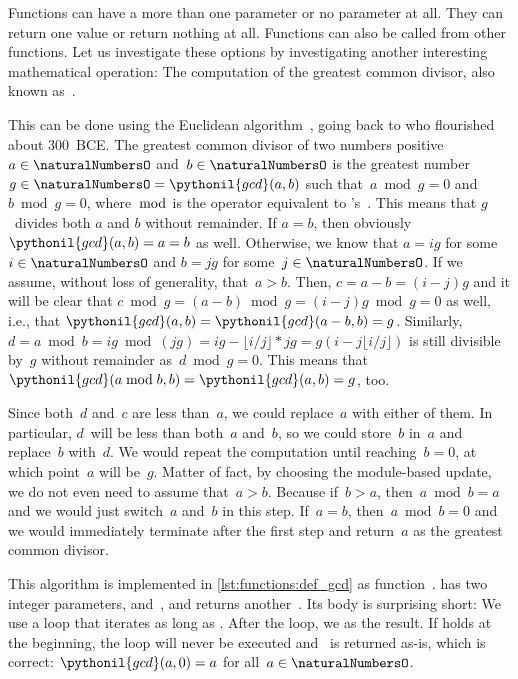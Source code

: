 %

Functions can have a more than one parameter or no parameter at all.
They can return one value or return nothing at all.
Functions can also be called from other functions.
Let us investigate these options by investigating another interesting mathematical operation:
The computation of the greatest common divisor, also known as~.

This can be done using the Euclidean algorithm~\cite{EHF2008ENT,B1999FAOTBEA,TKY2016BEOEAOTCEG}, going back to \citeauthor{EHF2008ENT} who flourished about 300~BCE.
The greatest common divisor of two numbers positive~$a\in\naturalNumbersO$ and~$b\in\naturalNumbersO$ is the greatest number~$g\in\naturalNumbersO=\pythonil{gcd}(a,b)$ such that~$a\bmod g=0$ and~$b \bmod g=0$, where~$\bmod$ is the  operator equivalent to \python's~\pythonilIdx{\%}.
This means that $g$~divides both $a$ and $b$ without remainder.
If $a=b$, then obviously $\pythonil{gcd}(a,b)=a=b$ as well.
Otherwise, we know that $a=ig$ for some~$i\in\naturalNumbersO$ and $b=jg$ for some~$j\in\naturalNumbersO$.
If we assume, without loss of generality, that~$a>b$.
Then, $c=a-b=(i-j)g$ and it will be clear that $c\bmod g=(a-b)\bmod g=(i-j)g\bmod g = 0$ as well, i.e., that $\pythonil{gcd}(a,b)=\pythonil{gcd}(a-b, b)=g$.
Similarly, $d=a\bmod b=ig\bmod (jg)=ig-\lfloor i/j\rfloor*jg=g(i-j\lfloor i/j\rfloor)$ is still divisible by~$g$ without remainder as~$d\bmod g=0$.
This means that~$\pythonil{gcd}(a\bmod b, b)=\pythonil{gcd}(a, b)=g$, too.

Since both~$d$ and~$c$ are less than~$a$, we could replace~$a$ with either of them.
In particular, $d$~will be less than both~$a$ and~$b$, so we could store~$b$ in~$a$ and replace~$b$ with~$d$.
We would repeat the computation until reaching~$b=0$, at which point~$a$ will be~$g$.
Matter of fact, by choosing the module-based update, we do not even need to assume that~$a>b$.
Because if~$b>a$, then~$a \bmod b=a$ and we would just switch~$a$ and~$b$ in this step.
If~$a=b$, then~$a \bmod b=0$ and we would immediately terminate after the first step and return~$a$ as the greatest common divisor.

This algorithm is implemented in \cref{lst:functions:def_gcd} as function~.
 has two integer parameters,  and~, and returns another~.
Its body is surprising short:
We use a  loop that iterates as long as .
After the loop, we  as the result.
If  holds at the beginning, the loop will never be executed and~ is returned as-is, which is correct:
$\pythonil{gcd}(a, 0)=a$ for all~$a\in\naturalNumbersO$.

